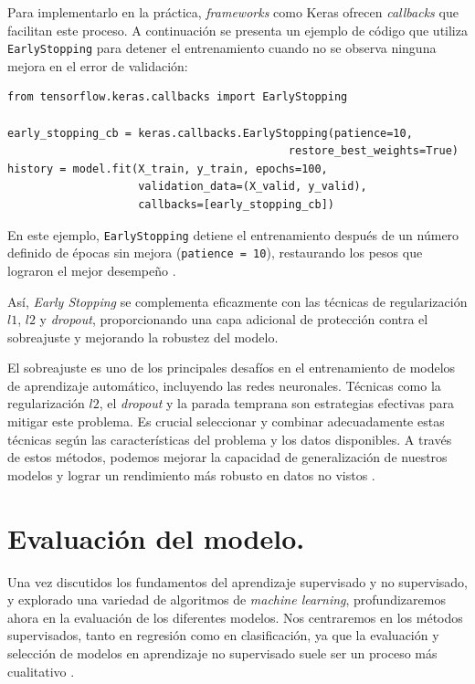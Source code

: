 Para implementarlo en la práctica, \textit{frameworks} como Keras ofrecen \textit{callbacks} que facilitan este proceso. A continuación se presenta un ejemplo de código que utiliza \lstinline|EarlyStopping| para detener el entrenamiento cuando no se observa ninguna mejora en el error de validación:


\lstset{language=Python}
\begin{lstlisting}
from tensorflow.keras.callbacks import EarlyStopping

early_stopping_cb = keras.callbacks.EarlyStopping(patience=10,
                                           restore_best_weights=True)
history = model.fit(X_train, y_train, epochs=100,
                    validation_data=(X_valid, y_valid),
                    callbacks=[early_stopping_cb])
\end{lstlisting}

En este ejemplo, \lstinline|EarlyStopping| detiene el entrenamiento después de un número definido de épocas sin mejora (\lstinline|patience = 10|), restaurando los pesos que lograron el mejor desempeño \citep{geron2022hands}.

Así, \textit{Early Stopping} se complementa eficazmente con las técnicas de regularización $l1$, $l2$ y \textit{dropout}, proporcionando una capa adicional de protección contra el sobreajuste y mejorando la robustez del modelo.

\bigskip


El sobreajuste es uno de los principales desafíos en el entrenamiento de modelos de aprendizaje automático, incluyendo las redes neuronales. Técnicas como la regularización \(l2\), el \textit{dropout} y la parada temprana son estrategias efectivas para mitigar este problema. Es crucial seleccionar y combinar adecuadamente estas técnicas según las características del problema y los datos disponibles. A través de estos métodos, podemos mejorar la capacidad de generalización de nuestros modelos y lograr un rendimiento más robusto en datos no vistos \citep{geron2022hands, pajares2021aprendizaje}.












\section{Evaluación del modelo.} 

Una vez discutidos los fundamentos del aprendizaje supervisado y no supervisado, y explorado una variedad de algoritmos de \textit{machine learning}, profundizaremos ahora en la evaluación de los diferentes modelos. Nos centraremos en los métodos supervisados, tanto en regresión como en clasificación, ya que la evaluación y selección de modelos en aprendizaje no supervisado suele ser un proceso más cualitativo \citep{muller2016introduction}. 


